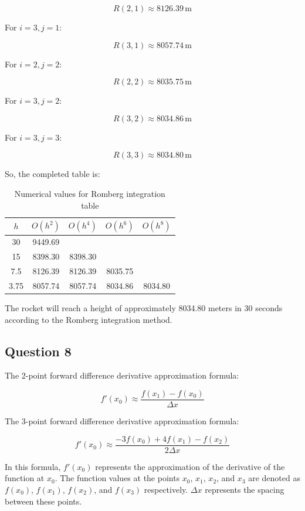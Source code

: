 \documentclass[12pt, a4paper]{article}
\numberwithin{equation}{section}
\begin{document}
  $$R(2, 1) \approx 8126.39 \, \text{m}$$

For \(i = 3, j = 1\):

  $$R(3, 1) \approx 8057.74 \, \text{m}$$

For \(i = 2, j = 2\):

  $$R(2, 2) \approx 8035.75 \, \text{m}$$

For \(i = 3, j = 2\):

  $$R(3, 2) \approx 8034.86 \, \text{m}$$

For \(i = 3, j = 3\):

  $$R(3, 3) \approx 8034.80 \, \text{m}$$

So, the completed table is:

\begin{table}[H]
    \centering
    \caption{Numerical values for Romberg integration table}
    \begin{tabular}{ccccc} \hline
        $h$ & $O(h^2)$ & $O(h^4)$ & $O(h^6)$ & $O(h^8)$ \\ \hline
        30 & 9449.69 & & &  \\
        15 & 8398.30 & 8398.30 & &  \\
        7.5 & 8126.39 & 8126.39 & 8035.75 &  \\
        3.75 & 8057.74 & 8057.74 & 8034.86 & 8034.80 \\ \hline
    \end{tabular}
\end{table}

The rocket will reach a height of approximately 8034.80 meters in 30 seconds according to the Romberg integration method.

\newpage
\newpage
\subsection{Question 8}

The 2-point forward difference derivative approximation formula:

\begin{equation}
f'(x_0) \approx \frac{{f(x_1) - f(x_0)}}{{\Delta x}}
\end{equation}

The 3-point forward difference derivative approximation formula:

\begin{equation}
f'(x_0) \approx \frac{{-3f(x_0) + 4f(x_1) - f(x_2)}}{{2\Delta x}}    
\end{equation}

In this formula, $f'(x_0)$ represents the approximation of the derivative of the function at $x_0$. The function values at the points $x_0$, $x_1$, $x_2$, and $x_3$ are denoted as $f(x_0)$, $f(x_1)$, $f(x_2)$, and $f(x_3)$ respectively. $\Delta x$ represents the spacing between these points.\\
\end{document}

